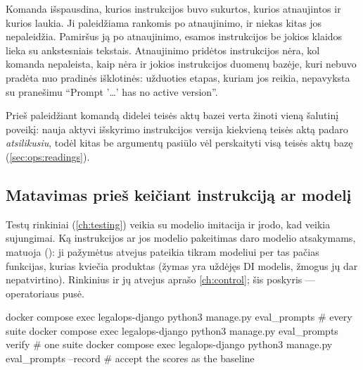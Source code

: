 Komanda išspausdina, kurios instrukcijos buvo sukurtos, kurios atnaujintos ir kurios laukia. Ji
paleidžiama rankomis po atnaujinimo, ir niekas kitas jos nepaleidžia. Pamiršus ją po
atnaujinimo, esamos instrukcijos be jokios klaidos lieka su ankstesniais tekstais. Atnaujinimo
pridėtos instrukcijos nėra, kol komanda nepaleista, kaip nėra ir jokios instrukcijos duomenų bazėje,
kuri nebuvo pradėta nuo pradinės išklotinės: užduoties etapas, kuriam jos reikia, nepavyksta su
pranešimu \enquote{Prompt '…' has no active version}.

Prieš paleidžiant komandą didelei teisės aktų bazei verta žinoti vieną šalutinį poveikį: nauja
aktyvi išskyrimo instrukcijos versija kiekvieną teisės aktą padaro \emph{atsilikusiu}, todėl kitas
 be argumentų pasiūlo vėl perskaityti visą teisės aktų bazę
(\cref{sec:ops:readings}).

\subsection{Matavimas prieš keičiant instrukciją ar modelį}

Testų rinkiniai (\cref{ch:testing}) veikia su modelio imitacija ir įrodo, kad veikia sujungimai. Ką
instrukcijos ar jos modelio pakeitimas daro modelio atsakymams, matuoja 
(): ji pažymėtus atvejus pateikia tikram
modeliui per tas pačias funkcijas, kurias kviečia produktas (žymas yra uždėjęs DI modelis, žmogus
jų dar nepatvirtino). Rinkinius ir jų atvejus aprašo \cref{ch:control}; šis poskyris --- operatoriaus
pusė.

\begin{codeblock}
docker compose exec legalops-django python3 manage.py eval_prompts            # every suite
docker compose exec legalops-django python3 manage.py eval_prompts verify     # one suite
docker compose exec legalops-django python3 manage.py eval_prompts --record   # accept the scores as the baseline
\end{codeblock}

